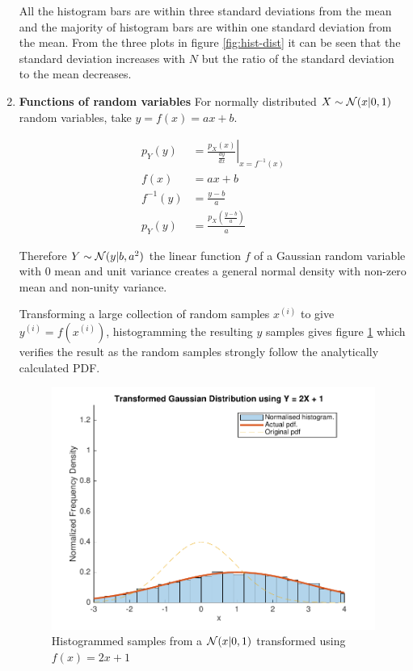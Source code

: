 \documentclass[12pt]{article}
\begin{document}
\begin{enumerate}
All the histogram bars are within three standard deviations from the mean and the majority of histogram bars are within one standard deviation from the mean. From the three plots in figure \ref{fig:hist-dist} it can be seen that the standard deviation increases with $N$ but the ratio of the standard deviation to the mean decreases.


\item {\bf Functions of random variables}
For normally distributed $X \sim {\cal N}(x|0,1)$ random variables, take $y=f(x)=ax+b$.


\begin{align*}
p_Y(y) &= \left. \frac {p_X(x)} {\frac {dy} {dx}} \right|_{x = f^ {-1} (x)} \\
f(x) &= ax + b \\
f^{-1}(y) &= \frac{y - b} a \\
p_Y(y) &= \frac {p_X \left (\frac {y - b} a \right)} a
\end{align*}

Therefore $Y \sim {\cal N}(y|b, a^2)$ the linear function $f$ of a Gaussian random variable with 0 mean and unit variance creates a general normal density with non-zero mean and non-unity variance.

Transforming a large collection of random samples $x^{(i)}$ to give $y^{(i)}=f(x^{(i)})$, histogramming the resulting $y$ samples gives figure \ref{fig:gaussian-linear-transform} which verifies the result as the random samples strongly follow the analytically calculated PDF.


\begin{figure}[H]
\includegraphics[width=\textwidth]{figures/gaussian-linear-transform.pdf}
  \caption{Histogrammed samples from a ${\cal N}(x|0,1)$ transformed using $f(x) = 2x + 1$ }
  \label{fig:gaussian-linear-transform}
\end{figure}





\end{enumerate}
\end{document}

